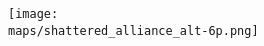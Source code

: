 \begin{multicols*}{2}
\vspace*{\fill}

\begin{center}
  \texttt{[image: \\maps/shattered\_alliance\_alt-6p.png]}
  \vspace*{\fill}
\end{center}

\end{multicols*}
